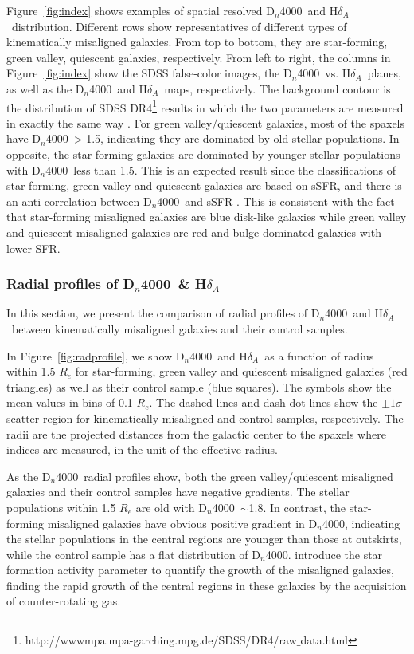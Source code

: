 \documentclass[a4paper,fleqn,usenatbib]{mnras}
\newcommand{\dindex}{D$_n$4000}
\newcommand{\hd}{H$\delta$}
\newcommand{\hda}{\hd$_A$}
\begin{document}
Figure~\ref{fig:index} shows examples of spatial resolved \dindex\ and
\hda\ distribution. Different rows show representatives of different 
types of kinematically misaligned galaxies. From top to bottom, they are 
star-forming, green valley, quiescent galaxies, respectively. From left to right, the 
columns in Figure~\ref{fig:index} show the SDSS false-color images, 
the \dindex\ vs. \hda\ planes, as well as the \dindex\ and \hda\ maps, respectively.
The background contour is the distribution of SDSS DR4\footnote{http://wwwmpa.mpa-garching.mpg.de/SDSS/DR4/raw$\_$data.html} 
results in which the two parameters are measured in exactly the same way \citep{brinchmann-2004}. 
For green valley/quiescent galaxies, most of the spaxels have \dindex\ > 1.5, 
indicating they are dominated by old stellar populations. 
In opposite, the star-forming galaxies are dominated by 
younger stellar populations with \dindex\ less than 1.5. 
This is an expected result since the classifications of star forming, green valley and quiescent galaxies are based on 
sSFR, and there is an anti-correlation between \dindex\ and sSFR \citep{kauffmann-2004}.
This is consistent with the fact that star-forming misaligned 
galaxies are blue disk-like galaxies while green valley and quiescent 
misaligned galaxies are red and bulge-dominated galaxies with lower SFR.

\subsubsection{Radial profiles of \dindex\ \& \hda} \label{sec: radprofile}

In this section, we present the comparison of radial profiles of \dindex\ and \hda\ between kinematically misaligned galaxies and their control samples.

In Figure~\ref{fig:radprofile}, we show \dindex\ and \hda\ as a function of radius within 1.5 $R_e$ for star-forming, green valley and quiescent misaligned galaxies (red triangles) as well as their control sample (blue squares). The symbols show the mean values in bins of 0.1 $R_e$. The dashed lines and dash-dot lines show the $\pm1\sigma$ scatter region for kinematically misaligned and control samples, respectively. The radii are the projected distances from the galactic center to the spaxels where indices are measured, in the unit of the effective radius.

As the \dindex\ radial profiles show, both the green valley/quiescent misaligned galaxies and their control samples have negative gradients. The stellar populations within 1.5 $R_e$ are old with \dindex\ $\sim$1.8. 
In contrast, the star-forming misaligned galaxies have obvious positive gradient in \dindex, indicating the stellar populations in the central regions are younger than those at outskirts, while the control sample has a flat distribution of \dindex. \cite{chen-prep} introduce the star formation activity parameter to quantify the growth of the misaligned galaxies, finding the rapid growth of the central regions in these galaxies by the acquisition of counter-rotating gas.
\end{document}
